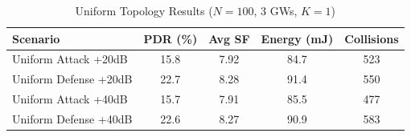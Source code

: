 \begin{table}[t]
\centering
\caption{Uniform Topology Results ($N=100$, 3 GWs, $K=1$)}
\label{tab:uniform}
\begin{tabular}{lcccc}
\toprule
Scenario & PDR (\%) & Avg SF & Energy (mJ) & Collisions \\
\midrule
Uniform Attack +20dB & 15.8 & 7.92 & 84.7 & 523 \\
Uniform Defense +20dB & 22.7 & 8.28 & 91.4 & 550 \\
Uniform Attack +40dB & 15.7 & 7.91 & 85.5 & 477 \\
Uniform Defense +40dB & 22.6 & 8.27 & 90.9 & 583 \\
\bottomrule
\end{tabular}
\end{table}
